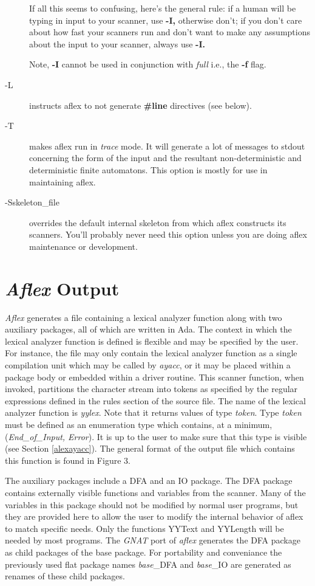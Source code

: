 \begin{description}
If all this seems to confusing, here's the general rule: if a human will
be typing in input to your scanner, use
{\bf -I,}
otherwise don't; if you don't care about how fast your scanners run and
don't want to make any assumptions about the input to your scanner,
always use
{\bf -I.}

Note,
{\bf -I}
cannot be used in conjunction with
{\it full}
i.e., the
{\bf -f}
flag.
\item[-L]
instructs aflex to not generate
{\bf \#line}
directives (see below).
\item[-T]
makes aflex run in
{\it trace}
mode.  It will generate a lot of messages to stdout concerning
the form of the input and the resultant non-deterministic and deterministic
finite automatons.  This option is mostly for use in maintaining aflex.
\item[-Sskeleton\_file]
overrides the default internal skeleton from which aflex constructs
its scanners.  You'll probably never need this option unless you are doing
aflex maintenance or development.
\end{description}
\section{{\sl Aflex} Output}
{\sl Aflex} generates a file containing a lexical analyzer function along
with two auxiliary packages, all of which are written in Ada.  
The context in which the lexical analyzer function is defined is flexible 
and may be specified by the user.  For instance,  the file may only 
contain the lexical analyzer function as a single compilation unit which 
may be called by {\sl ayacc},  
or it may be placed within a package body or embedded within a driver 
routine.  This scanner function, when invoked, partitions the character stream 
into tokens as specified by the regular expressions defined in the rules 
section of the source file.  The name of the lexical analyzer 
function is {\sl yylex}. Note that it returns values of type {\it token}.  
Type {\it token} must be defined as an enumeration type which contains, 
at a minimum, ({\it End\_of\_Input, Error}). It is up to the user to make 
sure that this type is visible (see Section \ref{alexayacc}). The general 
format of the output file which contains this function is found in
Figure 3.

\mysk
The auxiliary packages include a DFA and an IO package.  The DFA
package contains externally visible functions and variables from the
scanner.  Many of the variables in this package should not be modified
by normal user programs, but they are provided here to allow the user to
modify the internal behavior of aflex to match specific needs.  Only
the functions YYText and YYLength will be needed by most programs. The
{\sl GNAT} port of {\sl aflex} generates the DFA package as child packages
of the base package. For portability and conveniance the previously
used flat package names  {\sl base}\_DFA and {\sl base}\_IO are generated
as renames of these child packages.

